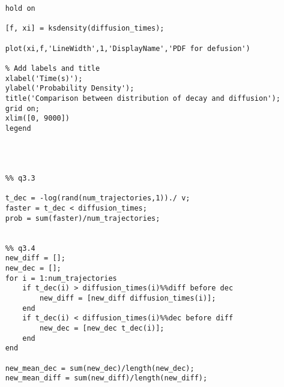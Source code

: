 \begin{lstlisting}
    hold on
    
    [f, xi] = ksdensity(diffusion_times);
    
    plot(xi,f,'LineWidth',1,'DisplayName','PDF for defusion')
    
    % Add labels and title
    xlabel('Time(s)');
    ylabel('Probability Density');
    title('Comparison between distribution of decay and diffusion');
    grid on;
    xlim([0, 9000])
    legend
    
    
    
    
    %% q3.3
    
    t_dec = -log(rand(num_trajectories,1))./ v;
    faster = t_dec < diffusion_times;
    prob = sum(faster)/num_trajectories;
    
    
    %% q3.4
    new_diff = [];
    new_dec = [];
    for i = 1:num_trajectories
        if t_dec(i) > diffusion_times(i)%%diff before dec
            new_diff = [new_diff diffusion_times(i)];
        end
        if t_dec(i) < diffusion_times(i)%%dec before diff
            new_dec = [new_dec t_dec(i)];
        end
    end
    
    new_mean_dec = sum(new_dec)/length(new_dec);
    new_mean_diff = sum(new_diff)/length(new_diff);
\end{lstlisting}